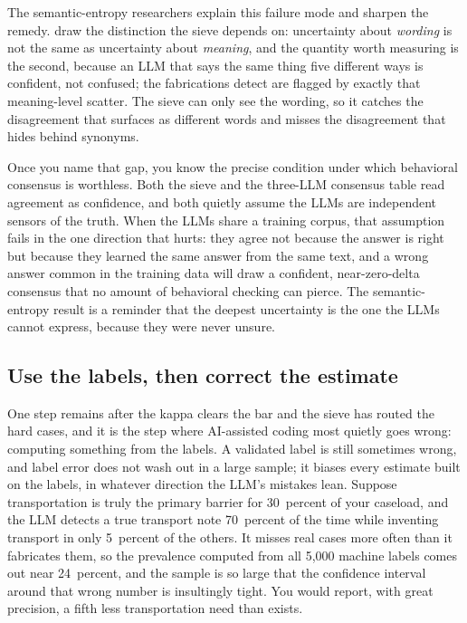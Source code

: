 \documentclass[
    a4paper,
    fontsize=10pt,
    twoside=true,
    numbers=noenddot,
]{kaobook}
\begin{document}
The semantic-entropy researchers explain this failure mode and sharpen the remedy. \textcite{kuhn2023semantic} draw the distinction the sieve depends on: uncertainty about \emph{wording} is not the same as uncertainty about \emph{meaning}, and the quantity worth measuring is the second, because an LLM that says the same thing five different ways is confident, not confused; the fabrications \textcite{farquhar2024semantic} detect are flagged by exactly that meaning-level scatter. The sieve can only see the wording, so it catches the disagreement that surfaces as different words and misses the disagreement that hides behind synonyms.

Once you name that gap, you know the precise condition under which behavioral consensus is worthless. Both the sieve and the three-LLM consensus table read agreement as confidence, and both quietly assume the LLMs are independent sensors of the truth. When the LLMs share a training corpus, that assumption fails in the one direction that hurts: they agree not because the answer is right but because they learned the same answer from the same text, and a wrong answer common in the training data will draw a confident, near-zero-delta consensus that no amount of behavioral checking can pierce. The semantic-entropy result is a reminder that the deepest uncertainty is the one the LLMs cannot express, because they were never unsure.

\subsection{Use the labels, then correct the estimate}\label{sec:ch13-ppi}
One step remains after the kappa clears the bar and the sieve has routed the hard cases, and it is the step where AI-assisted coding most quietly goes wrong: computing something from the labels. A validated label is still sometimes wrong, and label error does not wash out in a large sample; it biases every estimate built on the labels, in whatever direction the LLM's mistakes lean. Suppose transportation is truly the primary barrier for 30~percent of your caseload, and the LLM detects a true transport note 70~percent of the time while inventing transport in only 5~percent of the others. It misses real cases more often than it fabricates them, so the prevalence computed from all 5{,}000 machine labels comes out near 24~percent, and the sample is so large that the confidence interval around that wrong number is insultingly tight. You would report, with great precision, a fifth less transportation need than exists.
\end{document}

